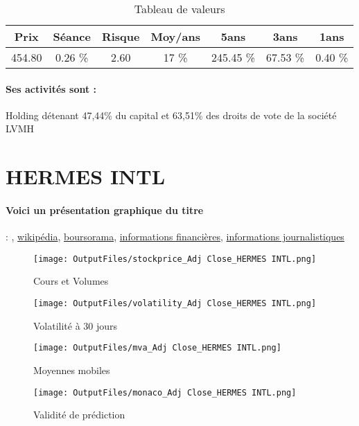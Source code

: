 \documentclass[11pt,a4paper]{report}%
\begin{document}
\begin{table}[H]
  \centering
    \begin{tabular}{|c|c|c|c|c|c|c|}
    \hline
    Prix & Séance & Risque  & Moy/ans & 5ans & 3ans & 1ans \\
    \hline
    454.80 &    0.26 \%    & 2.60 & 17 \% & 245.45 \% & 67.53 \% & 0.40 \% \\
    \hline
    \end{tabular}%
        \label{tab:table_CHRISTIAN DIOR}%
      \caption{Tableau de valeurs}
\end{table}%

\paragraph{Ses activités sont : } Holding détenant 47,44\% du capital et 63,51\% des droits de vote de la société LVMH 
    
    \newpage

\section{HERMES INTL}

\paragraph{Voici un présentation graphique du titre} : , \href{https://finance.hermes.com/}{wikipédia}, \href{https://www.boursorama.com/cours/1rPRMS}{boursorama}, \href{https://www.qwant.com/?q=site:https:%2f%2fwww.easybourse.com%2faction-societe%2fHERMES-INTL&t=web&client=ext-firefox-hp}{informations financières}, \href{https://bourse.lerevenu.com/cours-de-bourse/fiche-valeur-synthese/HERMES-INTL/RMS-FR}{informations journalistiques}
\begin{figure}[!htb]
   \begin{minipage}{0.5\textwidth}
     \centering
     \texttt{[image: OutputFiles/stockprice\_Adj Close\_HERMES INTL.png]}
     \caption{Cours et Volumes}\label{Fig:price_HERMES INTL}
   \end{minipage}\hfill
   \begin{minipage}{0.5\textwidth}
     \centering
     \texttt{[image: OutputFiles/volatility\_Adj Close\_HERMES INTL.png]}
     \caption{Volatilité à 30 jours}\label{Fig:volat_HERMES INTL}
   \end{minipage}
\end{figure}
\begin{figure}[!htb]
   \begin{minipage}{0.5\textwidth}
     \centering
     \texttt{[image: OutputFiles/mva\_Adj Close\_HERMES INTL.png]}
     \caption{Moyennes mobiles}\label{Fig:mva_HERMES INTL}
   \end{minipage}\hfill
   \begin{minipage}{0.5\textwidth}
     \centering
     \texttt{[image: OutputFiles/monaco\_Adj Close\_HERMES INTL.png]}
     \caption{Validité de prédiction}\label{Fig:prediction_HERMES INTL}
   \end{minipage}
\end{figure}
\end{document}
